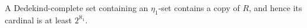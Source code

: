 A Dedekind-complete set containing an $\eta_1$-set contains a copy of $R$, and hence its cardinal is at least $2^{\aleph_1}$.
